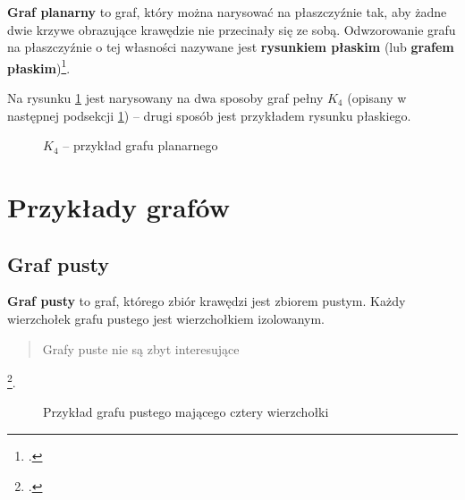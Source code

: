 \textbf{Graf planarny} to graf, który można narysować na płaszczyźnie tak, aby żadne dwie krzywe obrazujące krawędzie nie przecinały się ze sobą. Odwzorowanie grafu na płaszczyźnie o tej własności nazywane jest \textbf{rysunkiem płaskim} (lub \textbf{grafem płaskim})\footcite[82]{wilson}. 

Na rysunku \ref{fig:planar-graph-example} jest narysowany na dwa sposoby graf pełny $K_4$ (opisany w następnej podsekcji \ref{sec:common-graphs}) -- drugi sposób jest przykładem rysunku płaskiego. 

\begin{figure}[h]
\centering
{}
\caption{$K_4$ -- przykład grafu planarnego} \label{fig:planar-graph-example}
\end{figure}

\section{Przykłady grafów} \label{sec:common-graphs}

\subsection*{Graf pusty}

\textbf{Graf pusty} to graf, którego zbiór krawędzi jest zbiorem pustym. Każdy wierzchołek grafu pustego jest wierzchołkiem izolowanym. \blockquote{Grafy puste nie są zbyt interesujące}\footcite[30]{wilson}.

\begin{figure}[h]
\centering
{}
\captionsetup{justification=centering}
\caption{Przykład grafu pustego mającego cztery wierzchołki} \label{fig:empty-graph-example}
\end{figure}

